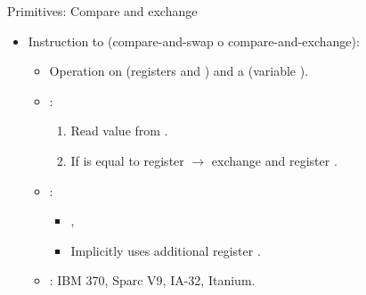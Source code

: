 \begin{frame}[t]{Primitives: Compare and exchange}
\begin{itemize}
  \item Instruction to  (compare-and-swap o compare-and-exchange):
    \begin{itemize}
      \item Operation on  (registers  and ) and a
              (variable ).

      \item {}:
        \begin{enumerate}

          \item Read value from .

          \item If  is equal to register  $\rightarrow$ exchange  and register .
        \end{enumerate}

      \item {}:
        \begin{itemize}
          \item {} , 
          \item Implicitly uses additional register .
        \end{itemize}

      \item {}: IBM 370, Sparc V9, IA-32, Itanium.
    \end{itemize}
\end{itemize}
\end{frame}

